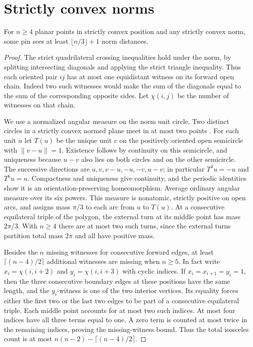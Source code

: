 \section{Strictly convex norms}

\begin{theorem}[982-T02]
For \(n\ge4\) planar points in strictly convex position and any strictly convex norm, some pin sees at least \(\lfloor n/3\rfloor+1\) norm distances.
\end{theorem}
\begin{proof}
The strict quadrilateral crossing inequalities hold under the norm, by splitting intersecting diagonals and applying the strict triangle inequality. Thus each oriented pair \(ij\) has at most one equidistant witness on its forward open chain. Indeed two such witnesses would make the sum of the diagonals equal to the sum of the corresponding opposite sides. Let \(\chi(i,j)\) be the number of witnesses on that chain.

We use a normalized angular measure on the norm unit circle. Two distinct circles in a strictly convex normed plane meet in at most two points \cite[Proposition 14]{msw}. For each unit \(u\) let \(T(u)\) be the unique unit \(v\) on the positively oriented open semicircle with \(\|v-u\|=1\). Existence follows by continuity on this semicircle, and uniqueness because \(u-v\) also lies on both circles and on the other semicircle. The successive directions are \(u,v,v-u,-u,-v,u-v\); in particular \(T^3u=-u\) and \(T^6u=u\). Compactness and uniqueness give continuity, and the periodic identities show it is an orientation-preserving homeomorphism. Average ordinary angular measure over its six powers. This measure is nonatomic, strictly positive on open arcs, and assigns mass \(\pi/3\) to each arc from \(u\) to \(T(u)\). At a consecutive equilateral triple of the polygon, the external turn at its middle point has mass \(2\pi/3\). With \(n\ge4\) there are at most two such turns, since the external turns partition total mass \(2\pi\) and all have positive mass.

Besides the \(n\) missing witnesses for consecutive forward edges, at least \(\lceil(n-4)/2\rceil\) additional witnesses are missing when \(n\ge5\). In fact write \(x_i=\chi(i,i+2)\) and \(y_i=\chi(i,i+3)\) with cyclic indices. If \(x_i=x_{i+1}=y_i=1\), then the three consecutive boundary edges at these positions have the same length, and the \(y_i\)-witness is one of the two interior vertices. Its equality forces either the first two or the last two edges to be part of a consecutive equilateral triple. Each middle point accounts for at most two such indices. At most four indices have all three terms equal to one. A zero term is counted at most twice in the remaining indices, proving the missing-witness bound. Thus the total isosceles count is at most \(n(n-2)-\lceil(n-4)/2\rceil\).


\end{proof}
